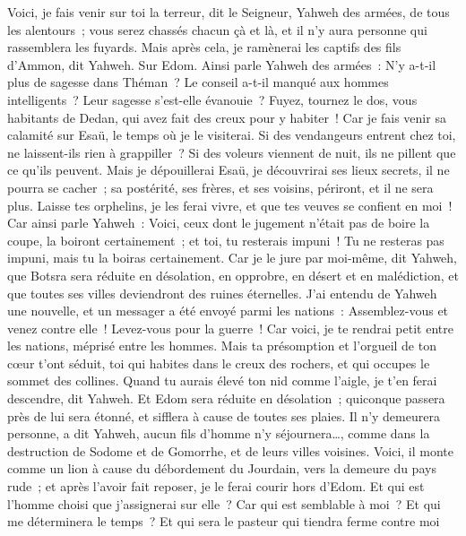 \begin{multicols}{2}
Voici, je fais venir sur toi la terreur, dit le Seigneur, Yahweh des armées, de tous les alentours~; vous serez chassés chacun çà et là, et il n'y aura personne qui rassemblera les fuyards.
Mais après cela, je ramènerai les captifs des fils d'Ammon, dit Yahweh.
Sur Edom. Ainsi parle Yahweh des armées~: N'y a-t-il plus de sagesse dans Théman~? Le conseil a-t-il manqué aux hommes intelligents~? Leur sagesse s'est-elle évanouie~?
Fuyez, tournez le dos, vous habitants de Dedan, qui avez fait des creux pour y habiter~! Car je fais venir sa calamité sur Esaü, le temps où je le visiterai.
Si des vendangeurs entrent chez toi, ne laissent-ils rien à grappiller~? Si des voleurs viennent de nuit, ils ne pillent que ce qu'ils peuvent.
Mais je dépouillerai Esaü, je découvrirai ses lieux secrets, il ne pourra se cacher~; sa postérité, ses frères, et ses voisins, périront, et il ne sera plus.
Laisse tes orphelins, je les ferai vivre, et que tes veuves se confient en moi~!
Car ainsi parle Yahweh~: Voici, ceux dont le jugement n'était pas de boire la coupe, la boiront certainement~; et toi, tu resterais impuni~! Tu ne resteras pas impuni, mais tu la boiras certainement.
Car je le jure par moi-même, dit Yahweh, que Botsra sera réduite en désolation, en opprobre, en désert et en malédiction, et que toutes ses villes deviendront des ruines éternelles.
J'ai entendu de Yahweh une nouvelle, et un messager a été envoyé parmi les nations~: Assemblez-vous et venez contre elle~! Levez-vous pour la guerre~!
Car voici, je te rendrai petit entre les nations, méprisé entre les hommes.
Mais ta présomption et l'orgueil de ton cœur t'ont séduit, toi qui habites dans le creux des rochers, et qui occupes le sommet des collines. Quand tu aurais élevé ton nid comme l'aigle, je t'en ferai descendre, dit Yahweh.
Et Edom sera réduite en désolation~; quiconque passera près de lui sera étonné, et sifflera à cause de toutes ses plaies.
Il n'y demeurera personne, a dit Yahweh, aucun fils d'homme n'y séjournera…, comme dans la destruction de Sodome et de Gomorrhe, et de leurs villes voisines.
Voici, il monte comme un lion à cause du débordement du Jourdain, vers la demeure du pays rude~; et après l'avoir fait reposer, je le ferai courir hors d'Edom. Et qui est l'homme choisi que j'assignerai sur elle~? Car qui est semblable à moi~? Et qui me déterminera le temps~? Et qui sera le pasteur qui tiendra ferme contre moi 

\end{multicols}
